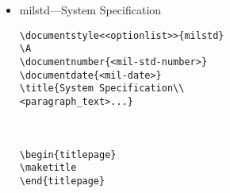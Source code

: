 \begin{itemize}
\begin{small}
\begin{verbatim}
\subsubsection{Special control features.}

\section{QUALITY ASSURANCE PROVISIONS}

\section{PREPARATION FOR DELIVERY}

\section{NOTES}

\appendix
%
% \section will now generate appendices starting with section 10, 20, etc.
%
\section{<text>} % Section 10, Appendix I

\section{<text>} % Section 20, Appendix II


\end{verbatim}
\end{small}

\item milstd---System Specification

\begin{small}
\begin{verbatim}
\documentstyle<<optionlist>>{milstd}
\A
\documentnumber{<mil-std-number>}
\documentdate{<mil-date>}
\title{System Specification\\
<paragraph_text>...}



\begin{titlepage}
\maketitle
\end{titlepage}


\end{verbatim}
\end{small}
\end{itemize}
